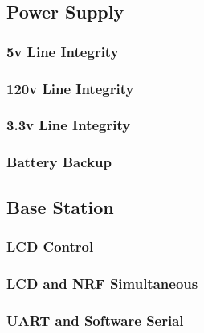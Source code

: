 \tbw

\subsection{Power Supply}

\subsubsection{5v Line Integrity}

\subsubsection{120v Line Integrity}

\subsubsection{3.3v Line Integrity}

\subsubsection{Battery Backup}

\subsection{Base Station}

\subsubsection{LCD Control}

\subsubsection{LCD and NRF Simultaneous}

\subsubsection{UART and Software Serial}

